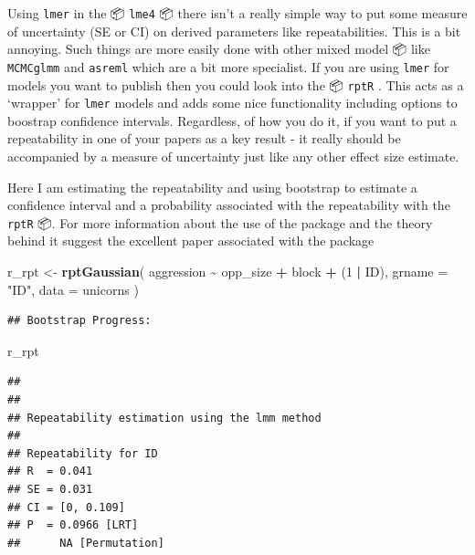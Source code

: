 \documentclass[
  12pt,
]{book}
\newenvironment{Shaded}{\begin{snugshade}}{\end{snugshade}}
\newcommand{\DataTypeTok}[1]{\textcolor[rgb]{0.13,0.29,0.53}{#1}}
\newcommand{\DecValTok}[1]{\textcolor[rgb]{0.00,0.00,0.81}{#1}}
\newcommand{\KeywordTok}[1]{\textcolor[rgb]{0.13,0.29,0.53}{\textbf{#1}}}
\newcommand{\NormalTok}[1]{#1}
\newcommand{\OperatorTok}[1]{\textcolor[rgb]{0.81,0.36,0.00}{\textbf{#1}}}
\newcommand{\StringTok}[1]{\textcolor[rgb]{0.31,0.60,0.02}{#1}}
\begin{document}
Using \texttt{lmer} in the 📦 \texttt{lme4} 📦 there isn't a really simple way to put some measure of uncertainty (SE or CI) on derived parameters like repeatabilities. This is a bit annoying. Such things are more easily done with other mixed model 📦 like \texttt{MCMCglmm} and \texttt{asreml} which are a bit more specialist. If you are using \texttt{lmer} for models you want to publish then you could look into the 📦 \texttt{rptR} \citep{R-rptR}. This acts as a `wrapper' for \texttt{lmer} models and adds some nice functionality including options to boostrap confidence intervals. Regardless, of how you do it, if you want to put a repeatability in one of your papers as a key result - it really should be accompanied by a measure of uncertainty just like any other effect size estimate.

Here I am estimating the repeatability and using bootstrap to estimate a confidence interval and a probability associated with the repeatability with the \texttt{rptR} 📦. For more information about the use of the package and the theory behind it suggest the excellent paper associated with the package \citep{rptR2017}

\begin{Shaded}
\begin{Highlighting}[]
\NormalTok{r\_rpt \textless{}{-}}\StringTok{ }\KeywordTok{rptGaussian}\NormalTok{(}
\NormalTok{  aggression }\OperatorTok{\textasciitilde{}}\StringTok{ }\NormalTok{opp\_size }\OperatorTok{+}\StringTok{ }\NormalTok{block }\OperatorTok{+}\StringTok{ }\NormalTok{(}\DecValTok{1} \OperatorTok{|}\StringTok{ }\NormalTok{ID),}
  \DataTypeTok{grname =} \StringTok{"ID"}\NormalTok{, }\DataTypeTok{data =}\NormalTok{ unicorns}
\NormalTok{)}
\end{Highlighting}
\end{Shaded}

\begin{verbatim}
## Bootstrap Progress:
\end{verbatim}

\begin{Shaded}
\begin{Highlighting}[]
\NormalTok{r\_rpt}
\end{Highlighting}
\end{Shaded}

\begin{verbatim}
## 
## 
## Repeatability estimation using the lmm method 
## 
## Repeatability for ID
## R  = 0.041
## SE = 0.031
## CI = [0, 0.109]
## P  = 0.0966 [LRT]
##      NA [Permutation]
\end{verbatim}
\end{document}
